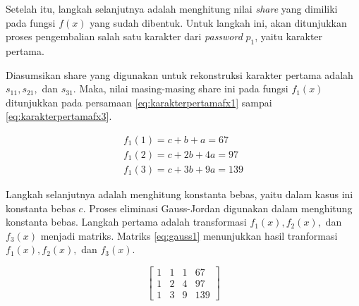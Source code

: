 Setelah itu, langkah selanjutnya adalah menghitung nilai \textit{share} yang dimiliki pada fungsi \begin{math}f(x)\end{math} yang sudah dibentuk. Untuk langkah ini, akan ditunjukkan proses pengembalian salah satu karakter dari \textit{password} \begin{math}p_1\end{math}, yaitu karakter pertama.

Diasumsikan share yang digunakan untuk rekonstruksi karakter pertama adalah \begin{math}s_{11}, s_{21}, \end{math} dan \begin{math}s_{31}\end{math}. Maka, nilai masing-masing share ini pada fungsi \begin{math}f_1(x)\end{math} ditunjukkan pada persamaan \ref{eq:karakterpertamafx1} sampai \ref{eq:karakterpertamafx3}.

\begin{align}
	f_1(1) = c + b + a = 67 \label{eq:karakterpertamafx1} \\
	f_1(2) = c + 2b + 4a = 97 \label{eq:karakterpertamafx2} \\
	f_1(3) = c + 3b + 9a = 139 \label{eq:karakterpertamafx3}
\end{align}

Langkah selanjutnya adalah menghitung konstanta bebas, yaitu dalam kasus ini konstanta bebas \begin{math}c\end{math}. Proses eliminasi Gauss-Jordan digunakan dalam menghitung konstanta bebas. Langkah pertama adalah transformasi \begin{math}f_1(x), f_2(x),\end{math} dan \begin{math}f_3(x)\end{math} menjadi matriks. Matriks \ref{eq:gauss1} menunjukkan hasil tranformasi \begin{math}f_1(x), f_2(x),\end{math} dan \begin{math}f_3(x)\end{math}.

\begin{center}
	\setlength\arraycolsep{10pt}
	\begin{equation}
		\begin{bmatrix}
				1 	& 1 	& 1 	& 67 		\\[1em]
				1 	& 2 	& 4 	& 97 		\\[1em]
				1 	& 3 	& 9 	& 139
		\end{bmatrix}
		\label{eq:gauss1}
	\end{equation}
\end{center}

